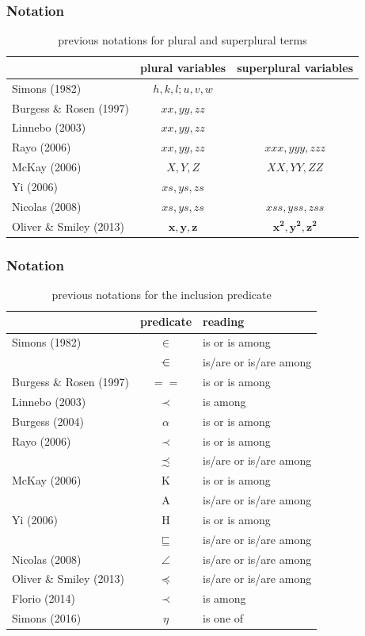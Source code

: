 \documentclass[serif]{beamer}
\newcommand{\among}{\preccurlyeq}
\begin{document}
\begin{frame}
\frametitle{Notation}

\small{
\begin{table}[htpb]
\centering
\begin{tabular}{l| c c}
& plural variables & superplural variables \\
\hline
Simons (1982)  & $h, k, l; u,v,w$  &         \\
Burgess \& Rosen (1997) & $xx, yy, zz$    &           \\
Linnebo (2003) & $xx, yy, zz$    &           \\
Rayo (2006)   & $xx, yy, zz$    & $xxx, yyy, zzz$   \\
McKay (2006)  & $X, Y, Z$     & $XX, YY, ZZ$    \\
Yi (2006)       & $xs, ys, zs$    &           \\
Nicolas (2008)   & $xs, ys, zs$    & $xss, yss, zss$   \\
Oliver \& Smiley (2013)  & $\mathbf{x,y,z}$  & $\mathbf{x^2,y^2,z^2}$  \\
\end{tabular}
\caption{previous notations for plural and superplural terms}\label{tab:terms}
\end{table}
}
\end{frame}

\begin{frame}
\frametitle{Notation}

\small{
\begin{table}[htpb]
\centering
\begin{tabular}{l| c l}
& predicate & reading \\
\hline
Simons (1982)  & $\in$   & is or is among\\
              & $\rotatebox{90}{\(\pitchfork\)}$ & is/are or is/are among\\
Burgess \& Rosen (1997)  & $= =$   & is or is among      \\
Linnebo (2003) & $\prec$ & is among          \\
Burgess (2004)   &$\alpha$ & is or is among      \\
Rayo (2006)     & $\prec$   & is or is among      \\
              & $\precsim$  & is/are or is/are among  \\
McKay (2006)   & K     & is or is among      \\
              & A     & is/are or is/are among  \\
Yi (2006)        & H     & is or is among      \\
              & $\sqsubseteq$   & is/are or is/are among  \\
Nicolas (2008)  & $\angle$  & is/are or is/are among  \\
Oliver \& Smiley (2013)  & $\among$  & is/are or is/are among  \\
Florio (2014) & $\prec$ & is among          \\
Simons (2016)  & $\eta$  & is one of
\end{tabular}
\caption{previous notations for the inclusion predicate}
\end{table}
}
\end{frame}
\end{document}

